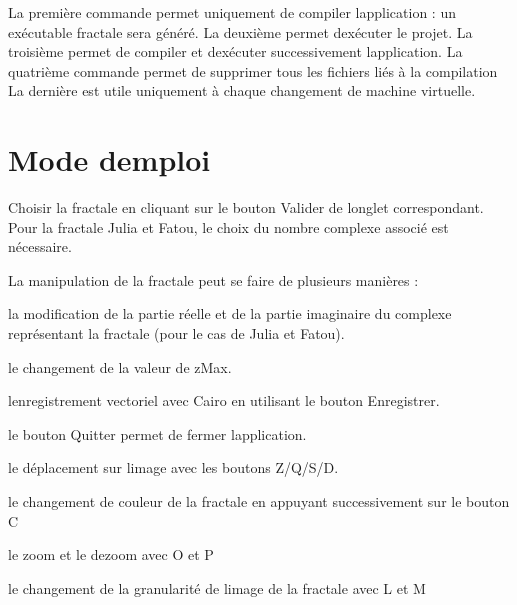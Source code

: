 La première commande permet uniquement de compiler l\textquotesingle{}application \+: un exécutable fractale sera généré. La deuxième permet d\textquotesingle{}exécuter le projet. La troisième permet de compiler et d\textquotesingle{}exécuter successivement l\textquotesingle{}application. La quatrième commande permet de supprimer tous les fichiers liés à la compilation La dernière est utile uniquement à chaque changement de machine virtuelle.

\section*{Mode d\textquotesingle{}emploi}


\begin{DoxyEnumerate}
\item Choisir la fractale en cliquant sur le bouton Valider de l\textquotesingle{}onglet correspondant. Pour la fractale Julia et Fatou, le choix du nombre complexe associé est nécessaire.
\item La manipulation de la fractale peut se faire de plusieurs manières \+:
\end{DoxyEnumerate}
\begin{DoxyItemize}
\item la modification de la partie réelle et de la partie imaginaire du complexe représentant la fractale (pour le cas de Julia et Fatou).
\item le changement de la valeur de z\+Max.
\item l\textquotesingle{}enregistrement vectoriel avec Cairo en utilisant le bouton Enregistrer.
\item le bouton Quitter permet de fermer l\textquotesingle{}application.
\item le déplacement sur l\textquotesingle{}image avec les boutons Z/\+Q/\+S/D.
\item le changement de couleur de la fractale en appuyant successivement sur le bouton C
\item le zoom et le dezoom avec O et P
\item le changement de la granularité de l\textquotesingle{}image de la fractale avec L et M 
\end{DoxyItemize}